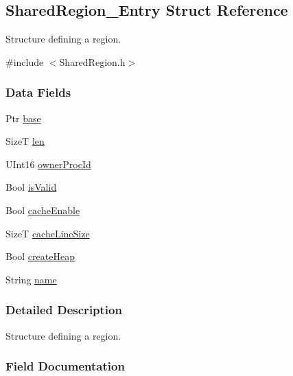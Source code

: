 \subsection{Shared\-Region\-\_\-\-Entry Struct Reference}
\label{struct_shared_region___entry}


Structure defining a region.  




{\ttfamily \#include $<$Shared\-Region.\-h$>$}

\subsubsection*{Data Fields}
\begin{DoxyCompactItemize}
\item 
Ptr \hyperlink{struct_shared_region___entry_a29bb9c93b43c2dd955f9fecbeb311987}{base}
\item 
Size\-T \hyperlink{struct_shared_region___entry_ae71dcd036cf9b3dbfd8be2541322f64e}{len}
\item 
U\-Int16 \hyperlink{struct_shared_region___entry_a5b14dd19f62a192f1aa843063d1cbbda}{owner\-Proc\-Id}
\item 
Bool \hyperlink{struct_shared_region___entry_ac2de956bb1b21e1372ba61a50c012ef5}{is\-Valid}
\item 
Bool \hyperlink{struct_shared_region___entry_a3aeb47b20eb18950a8ae1fb09d1ebade}{cache\-Enable}
\item 
Size\-T \hyperlink{struct_shared_region___entry_ad083825edd4d4a99389328d87976e4c5}{cache\-Line\-Size}
\item 
Bool \hyperlink{struct_shared_region___entry_a5db88d5d170d041d872527e9b5b71020}{create\-Heap}
\item 
String \hyperlink{struct_shared_region___entry_a1e87b924f55373c770d8d5add58b9267}{name}
\end{DoxyCompactItemize}


\subsubsection{Detailed Description}
Structure defining a region. 

\subsubsection{Field Documentation}
